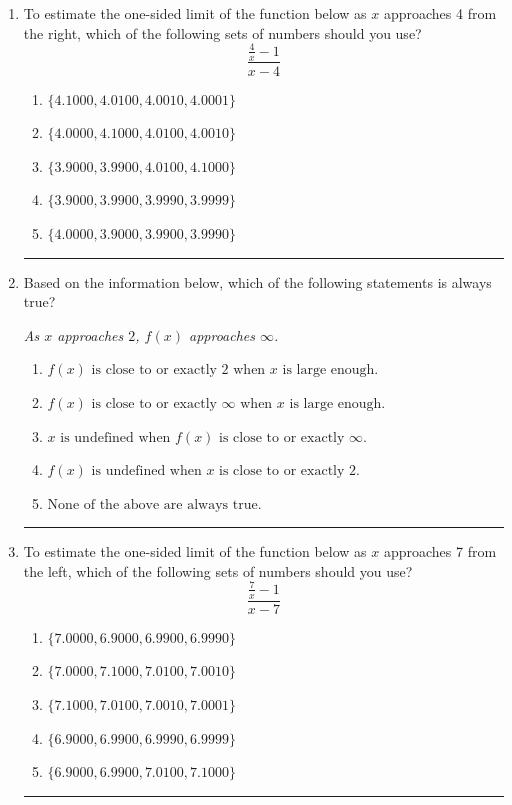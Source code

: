 \documentclass[14pt]{extbook}
\newcommand{\litem}[1]{\item#1\hspace*{-1cm}\rule{\textwidth}{0.4pt}}
\begin{document}
\begin{enumerate}
\litem{
To estimate the one-sided limit of the function below as $x$ approaches 4 from the right, which of the following sets of numbers should you use?\[ \frac{\frac{4}{x} - 1}{x - 4} \]\begin{enumerate}[label=\Alph*.]
\item \( \{ 4.1000, 4.0100, 4.0010, 4.0001 \} \)
\item \( \{ 4.0000, 4.1000, 4.0100, 4.0010 \} \)
\item \( \{ 3.9000, 3.9900, 4.0100, 4.1000 \} \)
\item \( \{ 3.9000, 3.9900, 3.9990, 3.9999 \} \)
\item \( \{ 4.0000, 3.9000, 3.9900, 3.9990 \} \)

\end{enumerate} }
\litem{
Based on the information below, which of the following statements is always true?
\begin{center}
    \textit{ As $x$ approaches $2$, $f(x)$ approaches $\infty$. }
\end{center}
\begin{enumerate}[label=\Alph*.]
\item \( f(x) \text{ is close to or exactly } 2 \text{ when } x \text{ is large enough}. \)
\item \( f(x) \text{ is close to or exactly } \infty \text{ when } x \text{ is large enough}. \)
\item \( x \text{ is undefined when } f(x) \text{ is close to or exactly } \infty. \)
\item \( f(x) \text{ is undefined when } x \text{ is close to or exactly } 2. \)
\item \( \text{None of the above are always true.} \)

\end{enumerate} }
\litem{
To estimate the one-sided limit of the function below as $x$ approaches 7 from the left, which of the following sets of numbers should you use?\[ \frac{\frac{7}{x} - 1}{x - 7} \]\begin{enumerate}[label=\Alph*.]
\item \( \{ 7.0000, 6.9000, 6.9900, 6.9990 \} \)
\item \( \{ 7.0000, 7.1000, 7.0100, 7.0010 \} \)
\item \( \{ 7.1000, 7.0100, 7.0010, 7.0001 \} \)
\item \( \{ 6.9000, 6.9900, 6.9990, 6.9999 \} \)
\item \( \{ 6.9000, 6.9900, 7.0100, 7.1000 \} \)


\end{enumerate}}
\end{enumerate}
\end{document}
